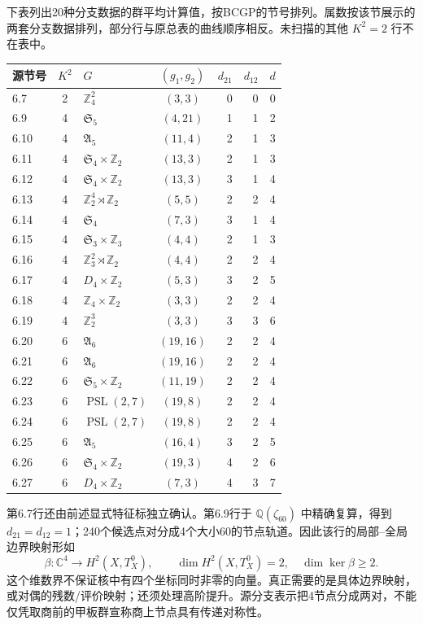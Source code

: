 \documentclass[UTF8,a4paper,11pt,fontset=fandol]{ctexart}
\numberwithin{equation}{section}
\theoremstyle{definition}
\newcommand{\Z}{\mathbb Z}
\begin{document}
下表列出20种分支数据的群平均计算值，按BCGP的节号排列。属数按该节展示的两套分支数据排列，部分行与原总表的曲线顺序相反。未扫描的其他 $K^2=2$ 行不在表中。
\begin{longtable}{@{}lclcrrr@{}}
\toprule 源节号 & $K^2$ & $G$ & $(g_1,g_2)$ & $d_{21}$ & $d_{12}$ & $d$\\\midrule\endhead
6.7 & 2 & $\Z_4^2$ & $(3,3)$ & 0 & 0 & 0\\
6.9 & 4 & $\mathfrak S_5$ & $(4,21)$ & 1 & 1 & 2\\
6.10 & 4 & $\mathfrak A_5$ & $(11,4)$ & 2 & 1 & 3\\
6.11 & 4 & $\mathfrak S_4\times\Z_2$ & $(13,3)$ & 2 & 1 & 3\\
6.12 & 4 & $\mathfrak S_4\times\Z_2$ & $(13,3)$ & 3 & 1 & 4\\
6.13 & 4 & $\Z_2^4\rtimes\Z_2$ & $(5,5)$ & 2 & 2 & 4\\
6.14 & 4 & $\mathfrak S_4$ & $(7,3)$ & 3 & 1 & 4\\
6.15 & 4 & $\mathfrak S_3\times\Z_3$ & $(4,4)$ & 2 & 1 & 3\\
6.16 & 4 & $\Z_3^2\rtimes\Z_2$ & $(4,4)$ & 2 & 2 & 4\\
6.17 & 4 & $D_4\times\Z_2$ & $(5,3)$ & 3 & 2 & 5\\
6.18 & 4 & $\Z_4\times\Z_2$ & $(3,3)$ & 2 & 2 & 4\\
6.19 & 4 & $\Z_2^3$ & $(3,3)$ & 3 & 3 & 6\\
6.20 & 6 & $\mathfrak A_6$ & $(19,16)$ & 2 & 2 & 4\\
6.21 & 6 & $\mathfrak A_6$ & $(19,16)$ & 2 & 2 & 4\\
6.22 & 6 & $\mathfrak S_5\times\Z_2$ & $(11,19)$ & 2 & 2 & 4\\
6.23 & 6 & $\operatorname{PSL}(2,7)$ & $(19,8)$ & 2 & 2 & 4\\
6.24 & 6 & $\operatorname{PSL}(2,7)$ & $(19,8)$ & 2 & 2 & 4\\
6.25 & 6 & $\mathfrak A_5$ & $(16,4)$ & 3 & 2 & 5\\
6.26 & 6 & $\mathfrak S_4\times\Z_2$ & $(19,3)$ & 4 & 2 & 6\\
6.27 & 6 & $D_4\times\Z_2$ & $(7,3)$ & 4 & 3 & 7\\\bottomrule
\end{longtable}
第6.7行还由前述显式特征标独立确认。第6.9行于 $\mathbb Q(\zeta_{60})$ 中精确复算，得到 $d_{21}=d_{12}=1$；240个候选点对分成4个大小60的节点轨道。因此该行的局部--全局边界映射形如
\[
\beta:\mathbb C^4\longrightarrow H^2(X,T_X^0),\qquad
\dim H^2(X,T_X^0)=2,\quad \dim\ker\beta\ge2.
\]
这个维数界不保证核中有四个坐标同时非零的向量。真正需要的是具体边界映射，或对偶的残数/评价映射；还须处理高阶提升。源分支表示把4节点分成两对，不能仅凭取商前的甲板群宣称商上节点具有传递对称性。
\end{document}

